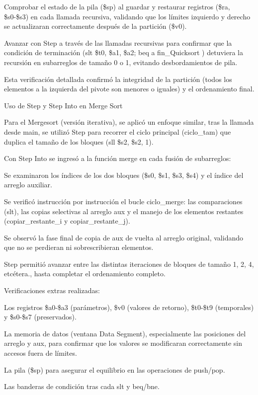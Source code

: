 \documentclass[12pt, letterpaper]{article}
\begin{document}
Comprobar el estado de la pila (\$sp) al guardar y restaurar registros (\$ra, \$s0-\$s3) en cada llamada recursiva, validando que los límites izquierdo y derecho se actualizaran correctamente después de la partición (\$v0).

Avanzar con Step a través de las llamadas recursivas para confirmar que la condición de terminación (slt \$t0, \$a1, \$a2; beq a fin\_Quicksort ) detuviera la recursión en subarreglos de tamaño 0 o 1, evitando desbordamientos de pila.

Esta verificación detallada confirmó la integridad de la partición (todos los elementos a la izquierda del pivote son menores o iguales) y el ordenamiento final.

 Uso de Step y Step Into en Merge Sort

Para el Mergesort (versión iterativa), se aplicó un enfoque similar, tras la llamada desde main, se utilizó Step para recorrer el ciclo principal (ciclo\_tam) que duplica el tamaño de los bloques (sll \$s2, \$s2, 1). 

Con Step Into se ingresó a la función merge en cada fusión de subarreglos:

Se examinaron los índices de los dos bloques (\$s0, \$s1, \$s3, \$s4) y el índice del arreglo auxiliar.

Se verificó instrucción por instrucción el bucle ciclo\_merge: las comparaciones (slt), las copias selectivas al arreglo aux y el manejo de los elementos restantes (copiar\_restante\_i y copiar\_restante\_j).

Se observó la fase final de copia de aux de vuelta al arreglo original, validando que no se perdieran ni sobrescribieran elementos.

Step permitió avanzar entre las distintas iteraciones de bloques de tamaño 1, 2, 4, etcétera., hasta completar el ordenamiento completo.

Verificaciones extras realizadas:

Los registros \$a0-\$a3 (parámetros), \$v0 (valores de retorno), \$t0-\$t9 (temporales) y \$s0-\$s7 (preservados).

La memoria de datos (ventana Data Segment), especialmente las posiciones del arreglo y aux, para confirmar que los valores se modificaran correctamente sin accesos fuera de límites.

La pila (\$sp) para asegurar el equilibrio en las operaciones de push/pop.

Las banderas de condición tras cada slt y beq/bne.
\end{document}
